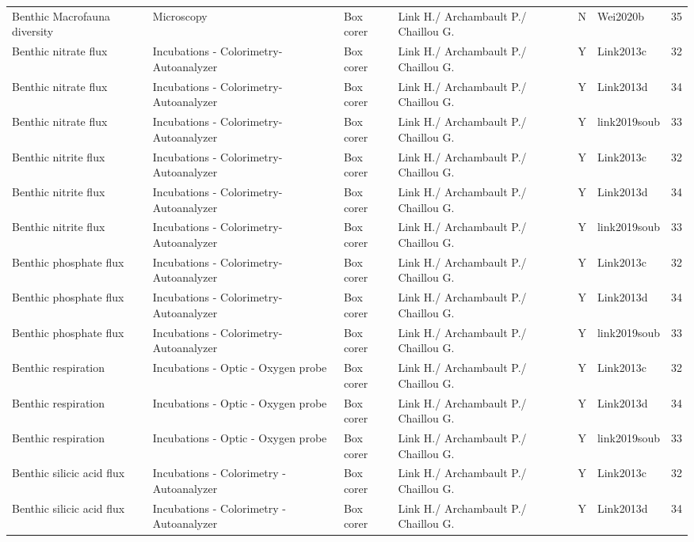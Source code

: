 \begin{ThreePartTable}
\begin{longtable}[t]{lllllll}
Benthic Macrofauna diversity & Microscopy & Box corer & Link H./ Archambault P./ Chaillou G. & N & Wei2020b & 35\\
\addlinespace
Benthic nitrate flux & Incubations - Colorimetry- Autoanalyzer & Box corer & Link H./ Archambault P./ Chaillou G. & Y & Link2013c & 32\\
Benthic nitrate flux & Incubations - Colorimetry- Autoanalyzer & Box corer & Link H./ Archambault P./ Chaillou G. & Y & Link2013d & 34\\
Benthic nitrate flux & Incubations - Colorimetry- Autoanalyzer & Box corer & Link H./ Archambault P./ Chaillou G. & Y & link2019soub & 33\\
Benthic nitrite flux & Incubations - Colorimetry- Autoanalyzer & Box corer & Link H./ Archambault P./ Chaillou G. & Y & Link2013c & 32\\
Benthic nitrite flux & Incubations - Colorimetry- Autoanalyzer & Box corer & Link H./ Archambault P./ Chaillou G. & Y & Link2013d & 34\\
\addlinespace
Benthic nitrite flux & Incubations - Colorimetry- Autoanalyzer & Box corer & Link H./ Archambault P./ Chaillou G. & Y & link2019soub & 33\\
Benthic phosphate flux & Incubations - Colorimetry- Autoanalyzer & Box corer & Link H./ Archambault P./ Chaillou G. & Y & Link2013c & 32\\
Benthic phosphate flux & Incubations - Colorimetry- Autoanalyzer & Box corer & Link H./ Archambault P./ Chaillou G. & Y & Link2013d & 34\\
Benthic phosphate flux & Incubations - Colorimetry- Autoanalyzer & Box corer & Link H./ Archambault P./ Chaillou G. & Y & link2019soub & 33\\
Benthic respiration & Incubations - Optic - Oxygen probe & Box corer & Link H./ Archambault P./ Chaillou G. & Y & Link2013c & 32\\
\addlinespace
Benthic respiration & Incubations - Optic - Oxygen probe & Box corer & Link H./ Archambault P./ Chaillou G. & Y & Link2013d & 34\\
Benthic respiration & Incubations - Optic - Oxygen probe & Box corer & Link H./ Archambault P./ Chaillou G. & Y & link2019soub & 33\\
Benthic silicic acid flux & Incubations - Colorimetry - Autoanalyzer & Box corer & Link H./ Archambault P./ Chaillou G. & Y & Link2013c & 32\\
Benthic silicic acid flux & Incubations - Colorimetry - Autoanalyzer & Box corer & Link H./ Archambault P./ Chaillou G. & Y & Link2013d & 34\\

\end{longtable}
\end{ThreePartTable}
